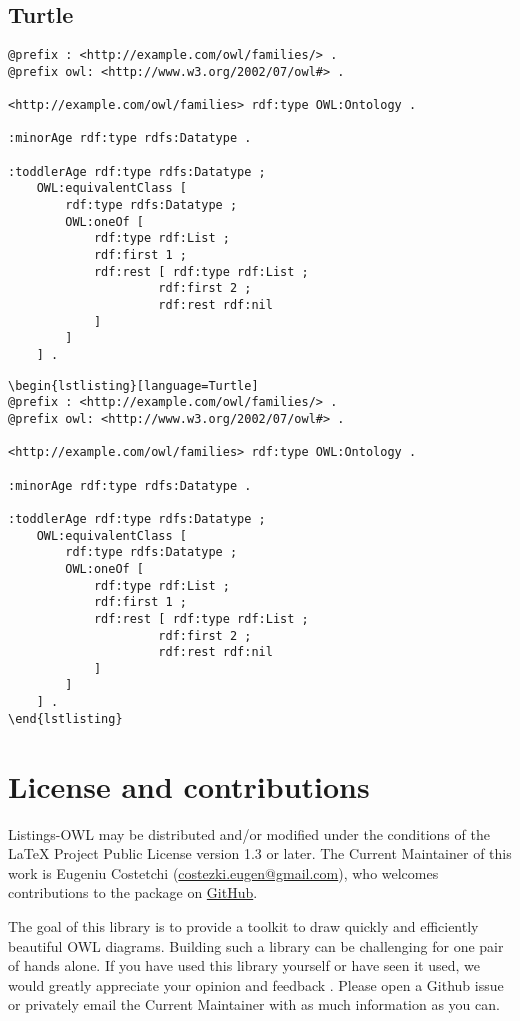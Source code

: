 \documentclass[11pt,a4paper,final,oneside,onecolumn]{article}
\begin{document}
	\subsection{Turtle}
\begin{lstlisting}[language=Turtle]
@prefix : <http://example.com/owl/families/> .
@prefix owl: <http://www.w3.org/2002/07/owl#> .

<http://example.com/owl/families> rdf:type OWL:Ontology .

:minorAge rdf:type rdfs:Datatype .

:toddlerAge rdf:type rdfs:Datatype ;
    OWL:equivalentClass [ 
        rdf:type rdfs:Datatype ;
        OWL:oneOf [ 
            rdf:type rdf:List ;
            rdf:first 1 ;
            rdf:rest [ rdf:type rdf:List ;
                     rdf:first 2 ;
                     rdf:rest rdf:nil
            ]
        ]   
    ] .
\end{lstlisting}

\begin{verbatim}
\begin{lstlisting}[language=Turtle]
@prefix : <http://example.com/owl/families/> .
@prefix owl: <http://www.w3.org/2002/07/owl#> .

<http://example.com/owl/families> rdf:type OWL:Ontology .

:minorAge rdf:type rdfs:Datatype .

:toddlerAge rdf:type rdfs:Datatype ;
    OWL:equivalentClass [ 
        rdf:type rdfs:Datatype ;
        OWL:oneOf [ 
            rdf:type rdf:List ;
            rdf:first 1 ;
            rdf:rest [ rdf:type rdf:List ;
                     rdf:first 2 ;
                     rdf:rest rdf:nil
            ]
        ]   
    ] .
\end{lstlisting}
\end{verbatim}		

	\section{License and contributions}
	Listings-OWL may be distributed and/or modified under the conditions of the LaTeX Project Public License version 1.3 or later. The Current Maintainer of this work is Eugeniu Costetchi (\url{costezki.eugen@gmail.com}), who welcomes contributions to the package on \href{https://github.com/costezki/owl4latex}{GitHub}.
	
	The goal of this library is to provide a toolkit to draw quickly and efficiently beautiful OWL diagrams. Building such a library can be challenging for one pair of hands alone. If you have used this library yourself or have seen it used, we would greatly appreciate your opinion and feedback . Please open a Github issue or privately email the Current Maintainer with as much information as you can. 
	
\end{document}
